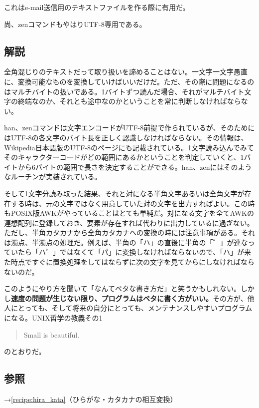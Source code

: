 これはe-mail送信用のテキストファイルを作る際に有用だ。

尚、zenコマンドもやはりUTF-8専用である。

\subsection*{解説}

全角混じりのテキストだって取り扱いを諦めることはない。一文字一文字愚直に、変換可能なものを変換していけばいいだけだ。ただ、その際に問題になるのはマルチバイトの扱いである。1バイトずつ読んだ場合、それがマルチバイト文字の終端なのか、それとも途中なのかということを常に判断しなければならない。

han、zenコマンドは文字エンコードがUTF-8前提で作られているが、そのためにはUTF-8の各文字のバイト長を正しく認識しなければならない。その情報は、Wikipedia日本語版のUTF-8のページにも記載されている。1文字読み込んでみてそのキャラクターコードがどの範囲にあるかということを判定していくと、1バイトから6バイトの範囲で長さを決定することができる。han、zenにはそのようなルーチンが実装されている。

そして1文字分読み取った結果、それと対になる半角文字あるいは全角文字が存在する時は、元の文字ではなく用意していた対の文字を出力すればよい。この時もPOSIX版AWKがやっていることはとても単純だ。対になる文字を全てAWKの連想配列に登録しておき、要素が存在すれば代わりに出力しているに過ぎない。ただし、半角カタカナから全角カタカナへの変換の時には注意事項がある。それは濁点、半濁点の処理だ。例えば、半角の「ハ」の直後に半角の「゜」が連なっていたら「ハ゜」ではなくて「パ」に変換しなければならないので、「ハ」が来た時点ですぐに置換処理をしてはならずに次の文字を見てからにしなければならないのだ。

このようにやり方を聞いて「なんてベタな書き方だ」と笑うかもしれない。しかし\textbf{速度の問題が生じない限り、プログラムはベタに書く方がいい。}その方が、他人にとっても、そして将来の自分にとっても、メンテナンスしやすいプログラムになる。UNIX哲学の教義その1
\begin{quote}
	Small is beautiful.
\end{quote}
のとおりだ。

\subsection*{参照}

\noindent
→\ref{recipe:hira_kata}（ひらがな・カタカナの相互変換）
